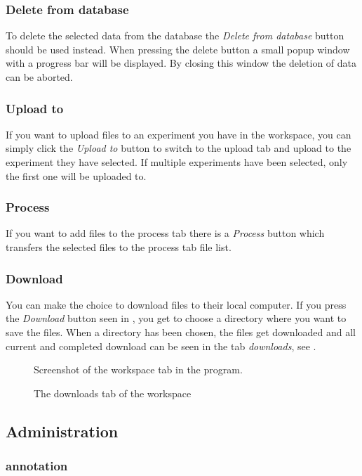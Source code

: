 \subsubsection{Delete from database}
To delete the selected data from the database the \emph{Delete from database} button should be used instead. When pressing the delete button a small popup window with a progress bar will be displayed. By closing this window the deletion of data can be aborted.
\subsubsection{Upload to}
If you want to upload files to an experiment you have in the workspace, you can simply click the \emph{Upload to} button to switch to the upload tab and upload to the experiment they have selected. If multiple experiments have been selected, only the first one will be uploaded to.
\subsubsection{Process}
If you want to add files to the process tab there is a \emph{Process} button which transfers the selected files to the process tab file list.
\subsubsection{Download}
You can make the choice to download files to their local computer. If you press the \emph{Download} button seen in , you get to choose a directory where you want to save the files. When a directory has been chosen, the files get downloaded and all current and completed download can be seen in the tab \emph{downloads}, see .
\begin{figure}[htb]
	\caption{Screenshot of the workspace tab in the program.}
	\label{fig:des_workspace-view}
\end{figure}
\begin{figure}[htb]
	\caption{The downloads tab of the workspace}
	\label{fig:des_download-view}
\end{figure}
\FloatBarrier

\subsection{Administration}
\subsubsection{annotation}

